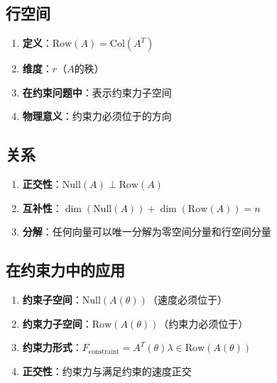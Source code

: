 \documentclass[12pt,a4paper]{article}
\begin{document}
\subsection{行空间}

\begin{enumerate}
\item \textbf{定义}：$\text{Row}(A) = \text{Col}(A^T)$
\item \textbf{维度}：$r$（$A$的秩）
\item \textbf{在约束问题中}：表示约束力子空间
\item \textbf{物理意义}：约束力必须位于的方向
\end{enumerate}

\subsection{关系}

\begin{enumerate}
\item \textbf{正交性}：$\text{Null}(A) \perp \text{Row}(A)$
\item \textbf{互补性}：$\dim(\text{Null}(A)) + \dim(\text{Row}(A)) = n$
\item \textbf{分解}：任何向量可以唯一分解为零空间分量和行空间分量
\end{enumerate}

\subsection{在约束力中的应用}

\begin{enumerate}
\item \textbf{约束子空间}：$\text{Null}(A(\theta))$（速度必须位于）
\item \textbf{约束力子空间}：$\text{Row}(A(\theta))$（约束力必须位于）
\item \textbf{约束力形式}：$F_{\text{constraint}} = A^T(\theta)\lambda \in \text{Row}(A(\theta))$
\item \textbf{正交性}：约束力与满足约束的速度正交
\end{enumerate}
\end{document}
